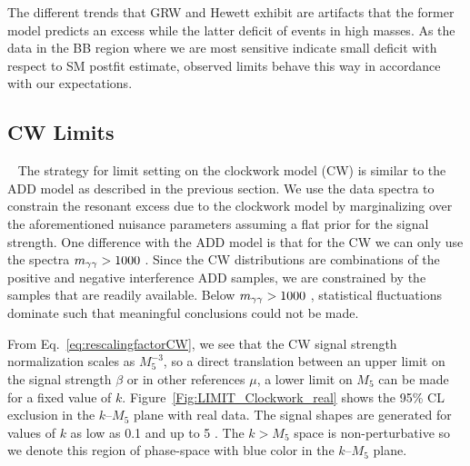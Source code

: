 The different trends that GRW and Hewett exhibit are artifacts that the former model predicts an excess while the latter deficit of events in high masses. As the data in the BB region where we are most sensitive indicate small deficit with respect to SM postfit estimate, observed limits behave this way in accordance with our expectations. 



\subsection{CW Limits}~\label{sec:CWlimits}
The strategy for limit setting on the clockwork model (CW) is similar to the ADD model as described in the previous section. We use the data \mgg spectra to constrain the resonant excess due to the clockwork model by marginalizing over the aforementioned nuisance parameters assuming a flat prior for the signal strength. One difference with the ADD model is that for the CW we can only use the spectra $m_{\gamma\gamma}>1000$ \GeV. Since the CW distributions are combinations of the positive and negative interference ADD samples, we are constrained by the samples that are readily available. Below $m_{\gamma\gamma}>1000$ \GeV, statistical fluctuations dominate such that meaningful conclusions could not be made. 

From Eq.~\ref{eq:rescalingfactorCW}, we see that the CW signal strength normalization scales as $M_5^{-3}$, so a direct translation between an upper limit on the signal strength $\beta$ or in other references $\mu$, a lower limit on $M_5$ can be made for a fixed value of $k$. Figure~\ref{Fig:LIMIT_Clockwork_real} shows the 95\% CL exclusion in the $k$--$M_5$ plane with real data.
The signal shapes are generated for values of $k$ as low as 0.1 \GeV and up to 5 \TeV. The $k>M_5$ space is non-perturbative so we denote this region of phase-space with blue color in the $k$--$M_5$ plane.

